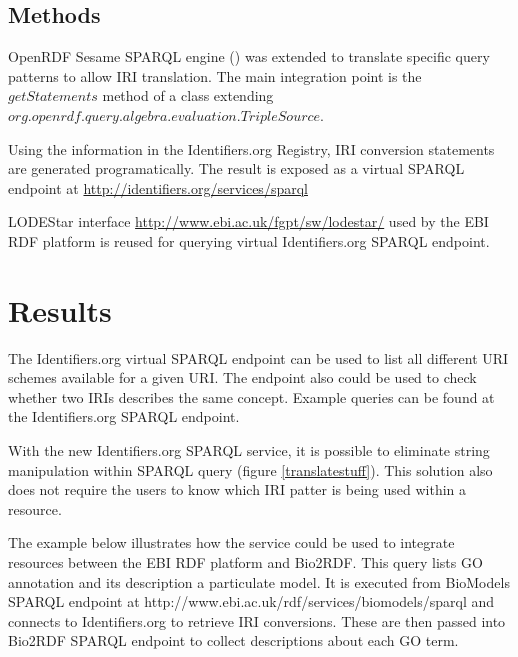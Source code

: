 \documentclass{bioinfo}
\begin{document}
\begin{methods}
	
\section{Methods}
OpenRDF Sesame SPARQL engine (\cite{SESAME}) was extended to translate specific query patterns to allow IRI translation. 
The main integration point is the $getStatements$ method of a class extending $org.openrdf.query.algebra.evaluation.TripleSource$.

Using the information in the Identifiers.org Registry, IRI conversion statements are generated programatically.
The result is exposed as a virtual SPARQL endpoint at \href{http://identifiers.org/services/sparql}{http://identifiers.org/services/sparql}

LODEStar interface \href{http://www.ebi.ac.uk/fgpt/sw/lodestar/}{http://www.ebi.ac.uk/fgpt/sw/lodestar/} used by the EBI RDF platform is reused for querying virtual Identifiers.org SPARQL endpoint.

\end{methods}

\section{Results}	
The Identifiers.org virtual SPARQL endpoint can be used to list all different URI schemes available for a given URI. 
The endpoint also could be used to check whether two IRIs describes the same concept. 
Example queries can be found at the Identifiers.org SPARQL endpoint.

With the new Identifiers.org SPARQL service, it is possible to eliminate string manipulation within SPARQL query (figure \ref{translatestuff}).
This solution also does not require the users to know which IRI patter is being used within a resource.

The example below illustrates how the service could be used to integrate resources between the EBI RDF platform and Bio2RDF.
This query lists GO annotation and its description a particulate model. 
It is executed from BioModels SPARQL endpoint at http://www.ebi.ac.uk/rdf/services/biomodels/sparql and connects to Identifiers.org to retrieve IRI conversions. 
These are then passed into Bio2RDF SPARQL endpoint to collect descriptions about each GO term.
\end{document}
